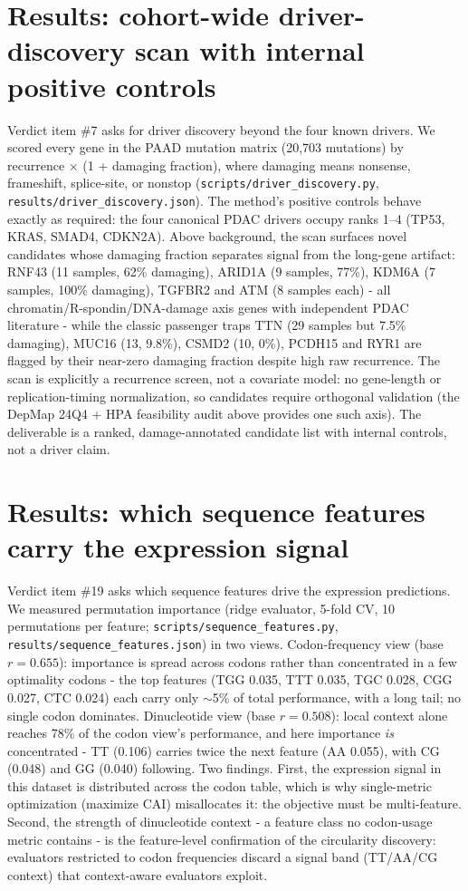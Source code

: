 \documentclass[11pt]{article}
\begin{document}
\section{Results: cohort-wide driver-discovery scan with internal positive controls}
\label{sec:driver-discovery}
Verdict item \#7 asks for driver discovery beyond the four known drivers. We
scored every gene in the PAAD mutation matrix (20{,}703 mutations) by recurrence
$\times$ (1 + damaging fraction), where damaging means nonsense, frameshift,
splice-site, or nonstop (\texttt{scripts/driver\_discovery.py},
\texttt{results/driver\_discovery.json}). The method's positive controls behave
exactly as required: the four canonical PDAC drivers occupy ranks 1--4 (TP53,
KRAS, SMAD4, CDKN2A). Above background, the scan surfaces novel candidates whose
damaging fraction separates signal from the long-gene artifact: RNF43 (11
samples, 62\% damaging), ARID1A (9 samples, 77\%), KDM6A (7 samples, 100\%
damaging), TGFBR2 and ATM (8 samples each) - all chromatin/R-spondin/DNA-damage
axis genes with independent PDAC literature - while the classic passenger traps
TTN (29 samples but 7.5\% damaging), MUC16 (13, 9.8\%), CSMD2 (10, 0\%), PCDH15
and RYR1 are flagged by their near-zero damaging fraction despite high raw
recurrence. The scan is explicitly a recurrence screen, not a covariate model:
no gene-length or replication-timing normalization, so candidates require
orthogonal validation (the DepMap 24Q4 + HPA feasibility audit above provides one such axis). The deliverable is a ranked,
damage-annotated candidate list with internal controls, not a driver claim.


\section{Results: which sequence features carry the expression signal}
\label{sec:features}
Verdict item \#19 asks which sequence features drive the expression predictions.
We measured permutation importance (ridge evaluator, 5-fold CV, 10 permutations
per feature; \texttt{scripts/sequence\_features.py},
\texttt{results/sequence\_features.json}) in two views. Codon-frequency view
(base $r=0.655$): importance is spread across codons rather than concentrated in
a few optimality codons - the top features (TGG 0.035, TTT 0.035, TGC 0.028,
CGG 0.027, CTC 0.024) each carry only $\sim$5\% of total performance, with a
long tail; no single codon dominates. Dinucleotide view (base $r=0.508$): local
context alone reaches 78\% of the codon view's performance, and here importance
\emph{is} concentrated - TT (0.106) carries twice the next feature (AA 0.055),
with CG (0.048) and GG (0.040) following. Two findings. First, the expression
signal in this dataset is distributed across the codon table, which is why
single-metric optimization (maximize CAI) misallocates it: the objective must be
multi-feature. Second, the strength of dinucleotide context - a feature class no
codon-usage metric contains - is the feature-level confirmation of the
circularity discovery: evaluators restricted to codon frequencies discard a
signal band (TT/AA/CG context) that context-aware evaluators exploit.
\end{document}
